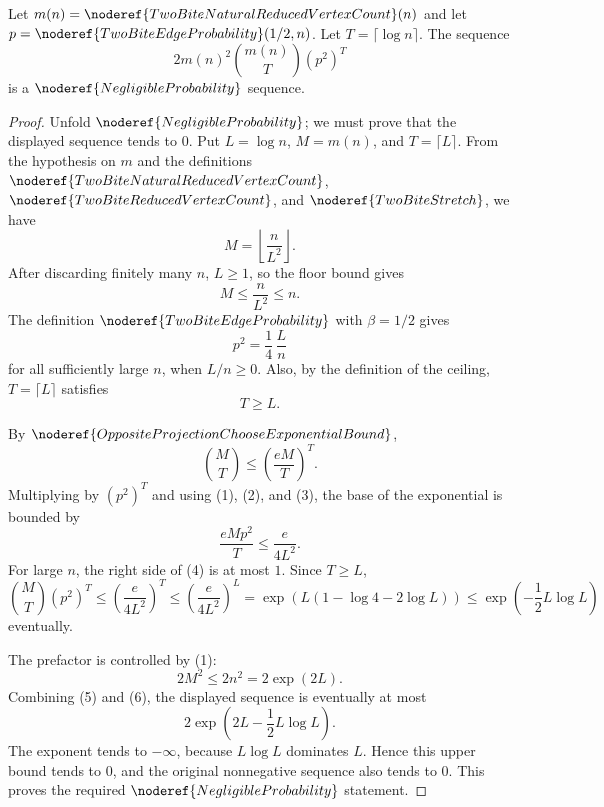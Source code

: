 \begin{helper}[SameColorCodegreeLimitBound]
\label{helper:SameColorCodegreeLimitBound}
Let \(m(n) = \noderef{TwoBiteNaturalReducedVertexCount}(n)\) and let \(p = \noderef{TwoBiteEdgeProbability}(1/2, n)\).
Let \(T = \lceil \log n \rceil\). The sequence
\[
2 m(n)^2 \binom{m(n)}{T} (p^2)^T
\]
is a \(\noderef{NegligibleProbability}\) sequence.
\end{helper}

\begin{proof}
Unfold \(\noderef{NegligibleProbability}\); we must prove that the displayed
sequence tends to \(0\).  Put \(L=\log n\), \(M=m(n)\), and
\(T=\lceil L\rceil\).  From the hypothesis on \(m\) and the definitions
\(\noderef{TwoBiteNaturalReducedVertexCount}\),
\(\noderef{TwoBiteReducedVertexCount}\), and \(\noderef{TwoBiteStretch}\), we
have
\[
M=\left\lfloor \frac{n}{L^2}\right\rfloor .
\]
After discarding finitely many \(n\), \(L\ge1\), so the floor bound gives
\[
M\le \frac{n}{L^2}\le n.
\tag{1}
\]
The definition \(\noderef{TwoBiteEdgeProbability}\) with \(\beta=1/2\) gives
\[
p^2=\frac14\,\frac{L}{n}
\tag{2}
\]
for all sufficiently large \(n\), when \(L/n\ge0\).  Also, by the definition
of the ceiling, \(T=\lceil L\rceil\) satisfies
\[
T\ge L.
\tag{3}
\]

By \(\noderef{OppositeProjectionChooseExponentialBound}\),
\[
\binom MT\le\left(\frac{eM}{T}\right)^T.
\]
Multiplying by \((p^2)^T\) and using (1), (2), and (3), the base of the
exponential is bounded by
\[
\frac{eMp^2}{T}
\le
\frac{e}{4L^2}.
\tag{4}
\]
For large \(n\), the right side of (4) is at most \(1\).  Since \(T\ge L\),
\[
\binom MT(p^2)^T
\le
\left(\frac{e}{4L^2}\right)^T
\le
\left(\frac{e}{4L^2}\right)^L
=
\exp\!\left(L(1-\log 4-2\log L)\right)
\le
\exp\!\left(-\frac12 L\log L\right)
\tag{5}
\]
eventually.

The prefactor is controlled by (1):
\[
2M^2\le2n^2=2\exp(2L).
\tag{6}
\]
Combining (5) and (6), the displayed sequence is eventually at most
\[
2\exp\!\left(2L-\frac12 L\log L\right).
\]
The exponent tends to \(-\infty\), because \(L\log L\) dominates \(L\).
Hence this upper bound tends to \(0\), and the original nonnegative sequence
also tends to \(0\).  This proves the required
\(\noderef{NegligibleProbability}\) statement.
\end{proof}

